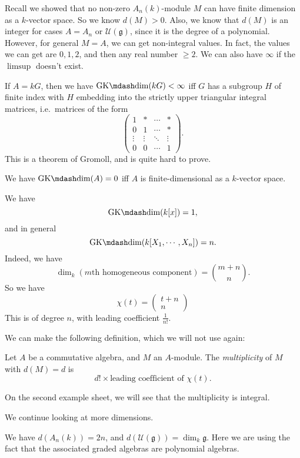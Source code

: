 \documentclass[a4paper]{article}
\newcommand\GKdim{\mathrm{GK}\mdash\mathrm{dim}}
\begin{document}
Recall we showed that no non-zero $A_n(k)$-module $M$ can have finite dimension as a $k$-vector space. So we know $d(M) > 0$. Also, we know that $d(M)$ is an integer for cases $A = A_n$ or $\mathcal{U}(\mathfrak{g})$, since it is the degree of a polynomial. However, for general $M = A$, we can get non-integral values. In fact, the values we can get are $0, 1, 2$, and then any real number $\geq 2$. We can also have $\infty$ if the $\limsup$ doesn't exist.

\begin{eg}
  If $A = kG$, then we have $\GKdim(kG) < \infty$ iff $G$ has a subgroup $H$ of finite index with $H$ embedding into the strictly upper triangular integral matrices, i.e.\ matrices of the form
  \[
    \begin{pmatrix}
      1 & * & \cdots & *\\
      0 & 1 & \cdots & *\\
      \vdots & \vdots & \ddots & \vdots\\
      0 & 0 & \cdots & 1
    \end{pmatrix}.
  \]
  This is a theorem of Gromoll, and is quite hard to prove.
\end{eg}

\begin{eg}
  We have $\GKdim(A)= 0$ iff $A$ is finite-dimensional as a $k$-vector space.

  We have
  \[
    \GKdim(k[x]) = 1,
  \]
  and in general
  \[
    \GKdim(k[X_1, \cdots, X_n]) = n.
  \]
  Indeed, we have
  \[
    \dim_k(\text{$m$th homogeneous component}) = \binom{m + n}{n}.
  \]
  So we have
  \[
    \chi(t) =
    \begin{pmatrix}
      t + n\\n
    \end{pmatrix}
  \]
  This is of degree $n$, with leading coefficient $\frac{1}{n!}$.
\end{eg}

We can make the following definition, which we will not use again:
\begin{defi}[Multiplicity]
  Let $A$ be a commutative algebra, and $M$ an $A$-module. The \emph{multiplicity} of $M$ with $d(M) = d$ is
  \[
    d! \times \text{leading coefficient of $\chi(t)$}.
  \]
\end{defi}
On the second example sheet, we will see that the multiplicity is integral.

We continue looking at more dimensions.
\begin{eg}
  We have $d(A_n(k)) = 2n$, and $d(\mathcal{U}(\mathfrak{g})) = \dim_k \mathfrak{g}$. Here we are using the fact that the associated graded algebras are polynomial algebras.
\end{eg}
\end{document}
